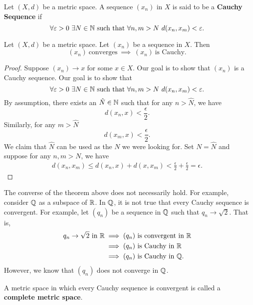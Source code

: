 \documentclass[a4paper]{book}
\begin{document}
\begin{definition}
    Let \( (X,d) \) be a metric space. A sequence \( ({x}_{n}) \) in \( X  \) is said to be a \textbf{Cauchy Sequence} if 
    \[  \forall \epsilon > 0 \ \exists N \in \N \ \text{such that} \ \forall n,m > N  \ d({x}_{n}, {x}_{m}) < \epsilon. \]
\end{definition}

\begin{theorem}
    Let \( (X,d) \) be a metric space. Let \( ({x}_{n}) \) be a sequence in \( X  \). Then
    \[  ({x}_{n}) \ \text{converges} \ \implies \ ({x}_{n}) \ \text{is Cauchy}.  \]
\end{theorem}

\begin{proof}
Suppose \( ({x}_{n}) \to x  \) for some \( x \in X  \). Our goal is to show that \( ({x}_{n}) \) is a Cauchy sequence. Our goal is to show that  
\[  \forall \epsilon > 0 \ \exists N \in \N \ \text{such that} \ \forall n,m > N \ d({x}_{n}, {x}_{m}) < \epsilon. \]
By assumption, there exists an \( \hat{N} \in \mathbb{N}  \) such that for any \( n > \hat{N}  \), we have
\[ d({x}_{n} ,x) < \frac{ \epsilon }{ 2 }. \tag{1}  \]
Similarly, for any \( m > \hat{N}  \)
\[  d({x}_{m}, x) < \frac{ \epsilon }{ 2 }.  \tag{2} \]
We claim that \( \hat{N} \) can be used as the \( N  \) we were looking for. Set \( N = \hat{N} \) and suppose for any \( n,m > N \), we have 
\begin{align*}
   d({x}_{n}, {x}_{m})  \leq d({x}_{n}, x) + d(x, {x}_{m}) 
                        < \frac{ \epsilon }{ 2 }  + \frac{ \epsilon }{ 2 }  
                        = \epsilon.
\end{align*}
\end{proof}

\begin{remark}
    The converse of the theorem above does not necessarily hold. For example, consider \( \mathbb{Q}  \) as a subspace of \( \mathbb{R}  \). In \( \mathbb{Q}  \), it is not true that every Cauchy sequence is convergent. For example, let \( ({q}_{n}) \) be a sequence in \( \mathbb{Q}  \) such that \( {q}_{n} \to \sqrt{ 2 }  \). That is,  
    \begin{align*}
        {q}_{n} \to \sqrt{ 2 } \ \text{in} \ \mathbb{R} &\implies ({q}_{n}) \ \text{is convergent in} \ \mathbb{R}  \\
                                                &\implies ({q}_{n}) \ \text{is Cauchy in} \ \mathbb{R} \\ 
                                                &\implies ({q}_{n})  \ \text{is Cauchy in} \ \mathbb{Q}.
    \end{align*}
    However, we know that \( ({q}_{n})  \) does not converge in \( \mathbb{Q}  \).
\end{remark}

\begin{definition}
    A metric space in which every Cauchy sequence is convergent is called a \textbf{complete metric space}.
\end{definition}
\end{document}
